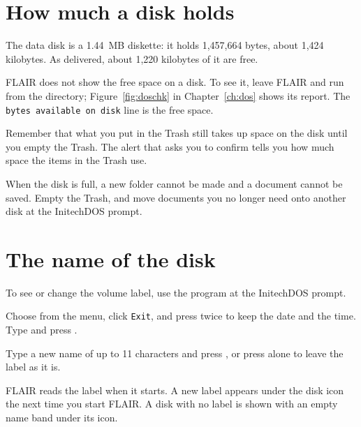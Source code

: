 \section{How much a disk holds}
The data disk is a 1.44~MB diskette: it holds 1,457,664 bytes, about 1,424
kilobytes.  As delivered, about 1,220 kilobytes of it are free.

FLAIR does not show the free space on a disk.  To see it, leave FLAIR and
run  from the  directory; Figure~\ref{fig:doschk} in
Chapter~\ref{ch:dos} shows its report.  The \texttt{bytes available on disk}
line is the free space.

Remember that what you put in the Trash still takes up space on the disk
until you empty the Trash.  The alert that asks you to confirm
 tells you how much space the items in the Trash use.

When the disk is full, a new folder cannot be made and a document cannot
be saved.  Empty the Trash, and move documents you no longer need onto
another disk at the InitechDOS prompt.

\section{The name of the disk}
To see or change the volume label, use the  program at the
InitechDOS prompt.
\begin{TaskSteps}
\Step Choose  from the  menu,
click \texttt{Exit}, and press  twice to keep the date and the
time.
\Step Type  and press .
\end{TaskSteps}


\begin{TaskSteps}[resume]
\Step Type a new name of up to 11 characters and press , or
press  alone to leave the label as it is.
\end{TaskSteps}
FLAIR reads the label when it starts.  A new label appears under the disk
icon the next time you start FLAIR.  A disk with no label is shown with an
empty name band under its icon.

